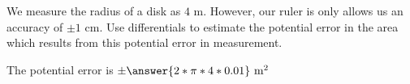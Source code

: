\documentclass{ximera}
\author{Steven Gubkin}
\begin{document}
\begin{exercise}



We measure the radius of a disk as $4 \textrm{ m}$.  However, our ruler is only allows us an accuracy of $\pm 1 \textrm{ cm}$.  Use differentials to estimate the potential error in the area which results from this potential error in measurement.

\begin{prompt}
	The potential error is $\pm \answer{2*\pi*4*0.01} \textrm{ m}^2$ 
\end{prompt}

\end{exercise}
\end{document}
